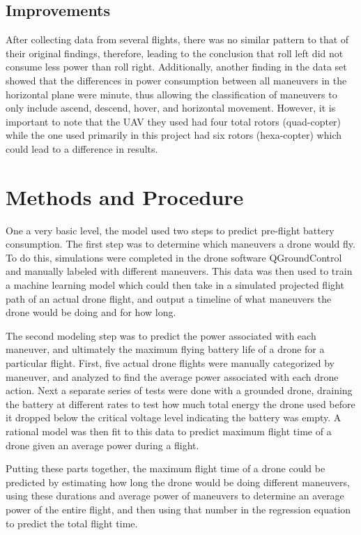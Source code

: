 \documentclass{article}
\begin{document}
\subsection{Improvements}
After collecting data from several flights, there was no similar pattern to that of their original findings, therefore, leading to the conclusion that roll left did not consume less power than roll right. Additionally, another finding in the data set showed that the differences in power consumption between all maneuvers in the horizontal plane were minute, thus allowing the classification of maneuvers to only include ascend, descend, hover, and horizontal movement. However, it is important to note that the UAV they used had four total rotors (quad-copter) while the one used primarily in this project had six rotors (hexa-copter) which could lead to a difference in results.


\section{Methods and Procedure}

One a very basic level, the model used two steps to predict pre-flight battery consumption. The first step was to determine which maneuvers a drone would fly. To do this, simulations were completed in the drone software QGroundControl and manually labeled with different maneuvers. This data was then used to train a machine learning model which could then take in a simulated projected flight path of an actual drone flight, and output a timeline of what maneuvers the drone would be doing and for how long.\par

The second modeling step was to predict the power associated with each maneuver, and ultimately the maximum flying battery life of a drone for a particular flight. First, five actual drone flights were manually categorized by maneuver, and analyzed to find the average power associated with each drone action. Next a separate series of tests were done with a grounded drone, draining the battery at different rates to test how much total energy the drone used before it dropped below the critical voltage level indicating the battery was empty. A rational model was then fit to this data to predict maximum flight time of a drone given an average power during a flight.\par

Putting these parts together, the maximum flight time of a drone could be predicted by estimating how long the drone would be doing different maneuvers, using these durations and average power of maneuvers to determine an average power of the entire flight, and then using that number in the regression equation to predict the total flight time.
\end{document}
